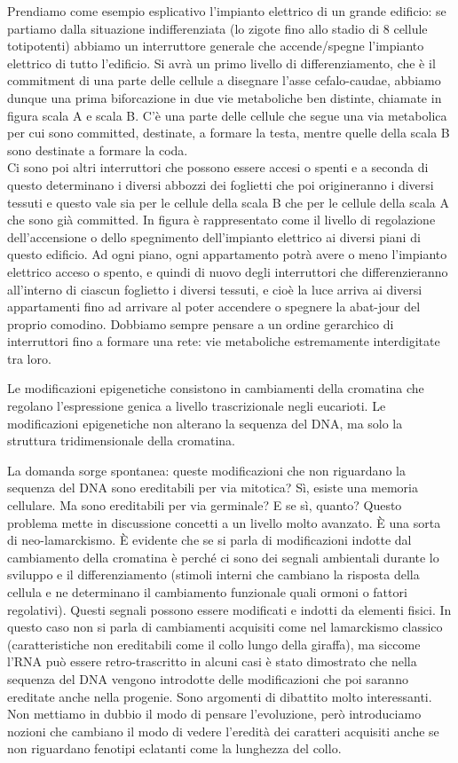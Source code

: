 \documentclass[11pt]{book}
\begin{document}
Prendiamo come esempio esplicativo l’impianto elettrico di un grande edificio: se partiamo dalla situazione indifferenziata (lo zigote fino allo stadio di 8 cellule totipotenti) abbiamo un interruttore generale che accende/spegne l’impianto elettrico di tutto l’edificio. Si avrà un primo livello di differenziamento, che è il commitment di una parte delle cellule a disegnare l’asse cefalo-caudae, abbiamo dunque una prima biforcazione in due vie metaboliche ben distinte, chiamate in figura scala A e scala B. C'è una parte delle cellule che segue una via metabolica per cui sono committed, destinate, a formare la testa, mentre quelle della scala B sono destinate a formare la coda.\\
Ci sono poi altri interruttori che possono essere accesi o spenti e a seconda di questo determinano i diversi abbozzi dei foglietti che poi origineranno i diversi tessuti e questo vale sia per le cellule della scala B che per le cellule della scala A che sono già committed. In figura è rappresentato come il livello di regolazione dell'accensione o dello spegnimento dell’impianto elettrico ai diversi piani di questo edificio. Ad ogni piano, ogni appartamento potrà avere o meno l’impianto elettrico acceso o spento, e quindi di nuovo degli interruttori che differenzieranno all’interno di ciascun foglietto i diversi tessuti, e cioè la luce arriva ai diversi appartamenti fino ad arrivare al poter accendere o spegnere la abat-jour del proprio comodino.
Dobbiamo sempre pensare a un ordine gerarchico di interruttori fino a formare una rete: vie metaboliche estremamente interdigitate tra loro.

Le modificazioni epigenetiche consistono in cambiamenti della cromatina che regolano l’espressione genica a livello trascrizionale negli eucarioti.
Le modificazioni epigenetiche non alterano la sequenza del DNA, ma solo la struttura tridimensionale della cromatina.

La domanda sorge spontanea: queste modificazioni che non riguardano la sequenza del DNA sono ereditabili per via mitotica? Sì, esiste una memoria cellulare. Ma sono ereditabili per via germinale? E se sì, quanto? Questo problema mette in discussione concetti a un livello molto avanzato. È una sorta di neo-lamarckismo. È evidente che se si parla di modificazioni indotte dal cambiamento della cromatina è perché ci sono dei segnali ambientali durante lo sviluppo e il differenziamento (stimoli interni che cambiano la risposta della cellula e ne determinano il cambiamento funzionale quali ormoni o fattori regolativi). Questi segnali possono essere modificati e indotti da elementi fisici. In questo caso non si parla di cambiamenti acquisiti come nel lamarckismo classico (caratteristiche non ereditabili come il collo lungo della giraffa), ma siccome l'RNA può essere retro-trascritto in alcuni casi è stato dimostrato che nella sequenza del DNA vengono introdotte delle modificazioni che poi saranno ereditate anche nella progenie. Sono argomenti di dibattito molto interessanti. Non mettiamo in dubbio il modo di pensare l’evoluzione, però introduciamo nozioni che cambiano il modo di vedere l’eredità dei caratteri acquisiti anche se non riguardano fenotipi eclatanti come la lunghezza del collo.
\end{document}
